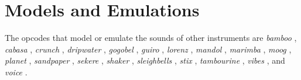\begin{comment}
\documentclass[10pt]{article}
\usepackage{fullpage, graphicx, url}
\setlength{\parskip}{1ex}
\setlength{\parindent}{0ex}
\title{Models and Emulations}



\begin{tabular}{ccc}
The Alternative Csound Reference Manual & & \\
Previous &Signal Generators &Next

\end{tabular}

\end{comment}
\section{Models and Emulations}


  The opcodes that model or emulate the sounds of other instruments are \emph{bamboo}
, \emph{cabasa}
, \emph{crunch}
, \emph{dripwater}
, \emph{gogobel}
, \emph{guiro}
, \emph{lorenz}
, \emph{mandol}
, \emph{marimba}
, \emph{moog}
, \emph{planet}
, \emph{sandpaper}
, \emph{sekere}
, \emph{shaker}
, \emph{sleighbells}
, \emph{stix}
, \emph{tambourine}
, \emph{vibes}
, and \emph{voice}
. 


\begin{comment}
\begin{tabular}{lcr}
Previous &Home &Next \\
Linear Predictive Coding (LPC) Resynthesis &Up &Phasors

\end{tabular}



\end{comment}
